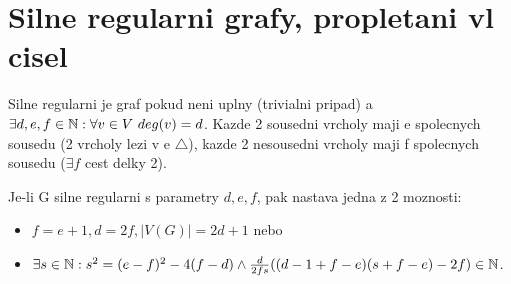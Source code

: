 \section{\texorpdfstring{Silne regularni grafy, propletani vl cisel}{Silne regularni grafy, propletani vl cisel}}
\vspace{5mm}
\large

\begin{definition}
	Silne regularni je graf pokud neni uplny (trivialni pripad) a $\exists d,e,f \in \operatorname{\mathbb{N}}: \forall v \in V \ deg(v) = d$.
	Kazde 2 sousedni vrcholy maji e spolecnych sousedu (2 vrcholy lezi v e $\triangle$), kazde 2 nesousedni vrcholy maji f spolecnych sousedu ($\exists f$ cest delky 2).
\end{definition}

\begin{theorem}
	Je-li G silne regularni s parametry $d,e,f$, pak nastava jedna z 2 moznosti:
	\begin{itemize}
		\item $f = e + 1, d = 2f, |V(G)| = 2d + 1$ nebo
		\item $\exists s \in \operatorname{\mathbb{N}}: s^2 = (e - f)^2 - 4(f - d) \land \frac{d}{2fs}((d - 1 + f - e)(s + f - e) - 2f) \in \operatorname{\mathbb{N}}$.
	\end{itemize}
\end{theorem}
